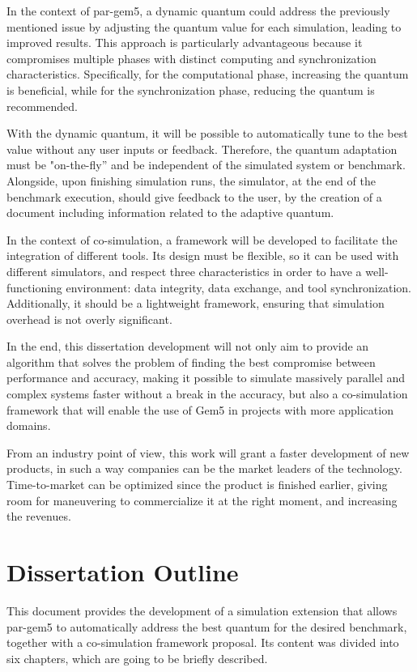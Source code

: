 In the context of par-gem5, a dynamic quantum could address the previously mentioned issue by adjusting the quantum value for each simulation, 
leading to improved results. 
This approach is particularly advantageous because it compromises multiple phases with distinct computing and synchronization 
characteristics. Specifically, for the computational phase, increasing the quantum is beneficial, while for the synchronization phase, 
reducing the quantum is recommended.

With the dynamic quantum, it will be possible to automatically tune to the best value without any user inputs or feedback. 
Therefore, the quantum adaptation must be "on-the-fly” and be independent of the simulated system or benchmark. 
Alongside, upon finishing simulation runs, the simulator, at the end of the benchmark execution, should give feedback to the user, 
by the creation of a document including information related to the adaptive quantum.

In the context of co-simulation, a framework will be developed to facilitate the integration of different tools. Its design 
must be flexible, so it can be used with different simulators, and respect three characteristics in order to have a well-functioning
environment: data integrity, data exchange, and tool synchronization. Additionally, it should be a lightweight framework, 
ensuring that simulation overhead is not overly significant.

In the end, this dissertation development will not only aim to provide an algorithm that solves the problem of 
finding the best compromise between performance and accuracy, making it possible to simulate 
massively parallel and complex systems faster without a break in the accuracy, but also a co-simulation framework that will enable the use 
of Gem5 in projects with more application domains.

From an industry point of view, this work will grant a faster development of new products, in such a way companies can be the market leaders 
of the technology. Time-to-market can be optimized since the product is finished earlier, giving room for maneuvering to commercialize it at the 
right moment, and increasing the revenues.
 
\section{Dissertation Outline}

This document provides the development of a simulation extension that allows par-gem5 to automatically address the best quantum for the desired 
benchmark, together with a co-simulation framework proposal. Its content was divided into six chapters, which are going to be briefly described.

